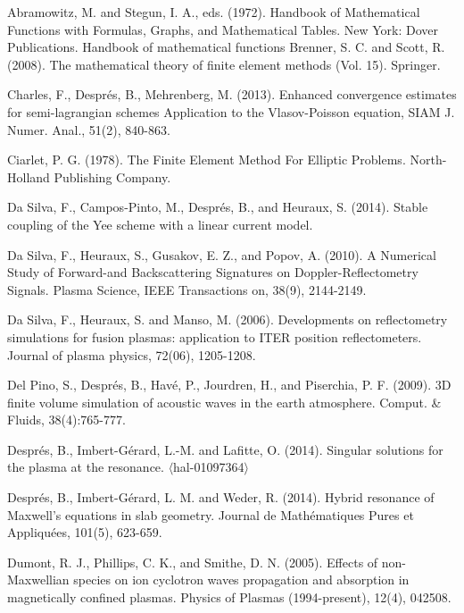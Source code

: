 \documentclass[proc]{edpsmath}
\begin{document}
\begin{thebibliography}{99}
	
	
 Abramowitz, M. and Stegun, I. A., eds. (1972). Handbook of Mathematical Functions with Formulas, Graphs, and Mathematical Tables. New York: Dover Publications.
	Handbook of mathematical functions
 Brenner, S. C. and Scott, R. (2008). The mathematical theory of finite element methods (Vol. 15). Springer.

Charles, F., Despr\'es, B., Mehrenberg, M.  (2013).  
Enhanced convergence estimates for semi-lagrangian schemes Application to the Vlasov-Poisson equation, SIAM J. Numer. Anal., 51(2), 840-863.

Ciarlet, P. G. (1978).  The Finite Element Method For Elliptic Problems. North-Holland Publishing Company.


 Da Silva, F., Campos-Pinto, M., Després, B., and Heuraux, S. (2014). Stable coupling of the Yee scheme with a linear current model.

 Da Silva, F., Heuraux, S., Gusakov, E. Z., and Popov, A. (2010). A Numerical Study of Forward-and Backscattering Signatures on Doppler-Reflectometry Signals. Plasma Science, IEEE Transactions on, 38(9), 2144-2149.



 Da Silva, F., Heuraux, S. and  Manso, M. (2006). Developments on reflectometry simulations for fusion plasmas: application to ITER position reflectometers. Journal of plasma physics, 72(06), 1205-1208.


Del Pino, S., Despr\'es, B., Hav\'e, P., Jourdren, H., and Piserchia, P. F. (2009). 3D finite
volume simulation of acoustic waves in the earth atmosphere.
Comput. \&
Fluids, 38(4):765-777.

Despr\'es, B., Imbert-G\'erard, L.-M. and Lafitte, O. (2014). Singular solutions for the plasma at the resonance. $\langle$hal-01097364$\rangle$


 Després, B., Imbert-Gérard, L. M. and Weder, R. (2014). Hybrid resonance of Maxwell's equations in slab geometry. Journal de Mathématiques Pures et Appliquées, 101(5), 623-659.



 Dumont, R. J., Phillips, C. K., and Smithe, D. N. (2005). Effects of non-Maxwellian species on ion cyclotron waves propagation and absorption in magnetically confined plasmas. Physics of Plasmas (1994-present), 12(4), 042508.


\end{thebibliography}
\end{document}
